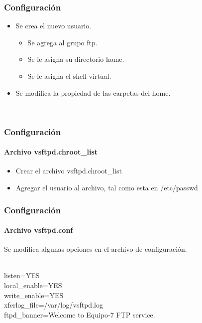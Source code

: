    \begin{frame}
     \frametitle{Configuraci\'on}
    \begin{itemize}
      \item Se crea el nuevo usuario.
      \begin{itemize}
        \item Se agrega al grupo ftp.
        \item Se le asigna su directorio home.
        \item Se le asigna el shell virtual.
      \end{itemize}
      \item Se modifica la propiedad de las carpetas del home.
    \end{itemize}
    
    \begin{shell}
      \\
    \hline\end{shell}
   \end{frame}

   \begin{frame}
     \frametitle{Configuraci\'on}
     \framesubtitle{Archivo vsftpd.chroot\_list}
     \begin{itemize}
       \item Crear el archivo vsftpd.chroot\_list
       \item Agregar el usuario al archivo, tal como esta en /etc/passwd
     \end{itemize}
    \begin{shell}
    \hline\end{shell}
   \end{frame}

  \begin{frame}
    \frametitle{Configuraci\'on}
    \framesubtitle{Archivo vsftpd.conf}
    Se modifica algunas opciones en el archivo de configuraci\'on.
    \begin{shell}\\
      listen=YES\\
      local\_enable=YES\\
      write\_enable=YES\\
      xferlog\_file=/var/log/vsftpd.log\\
      ftpd\_banner=Welcome to Equipo-7 FTP service.\\ \\
    \hline\end{shell}
   \end{frame}
   
